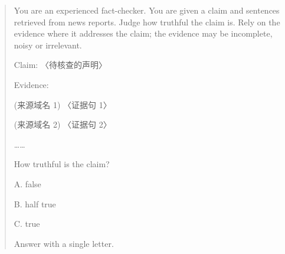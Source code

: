 {\small\setlength{\parindent}{0pt}\begin{quote}
You are an experienced fact-checker. You are given a claim and sentences retrieved from news reports. Judge how truthful the claim is. Rely on the evidence where it addresses the claim; the evidence may be incomplete, noisy or irrelevant.\par
\vspace{3pt}
Claim: 〈待核查的声明〉\par
\vspace{3pt}
Evidence:\par
[1] (来源域名 1) 〈证据句 1〉\par
[2] (来源域名 2) 〈证据句 2〉\par
……\par
\vspace{3pt}
How truthful is the claim?\par
A. false\par
B. half true\par
C. true\par
Answer with a single letter.\par
\end{quote}}
